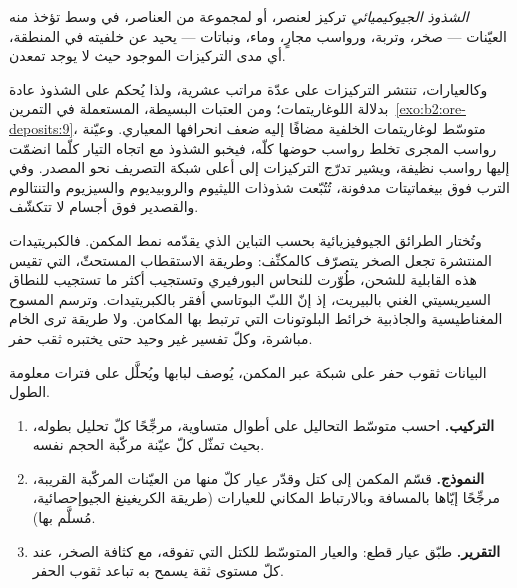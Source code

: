 \begin{definition}\label{def:b2:ore-deposits:exploration}
\emph{الشذوذ الجيوكيميائي} تركيز لعنصر، أو لمجموعة من
العناصر، في وسط تؤخذ منه العيّنات --- صخر، وتربة، ورواسب مجارٍ، وماء، ونباتات --- يحيد
عن خلفيته في المنطقة، أي مدى التركيزات الموجود حيث لا يوجد
تمعدن.
\end{definition}

وكالعيارات، تنتشر التركيزات على عدّة مراتب عشرية، ولذا يُحكم على الشذوذ عادة بدلالة
اللوغاريتمات؛ ومن العتبات البسيطة، المستعملة في التمرين~\ref{exo:b2:ore-deposits:9}، متوسّط
لوغاريتمات الخلفية مضافًا إليه ضعف انحرافها المعياري. وعيّنة رواسب المجرى
تخلط رواسب حوضها كلّه، فيخبو الشذوذ مع اتجاه التيار كلّما انضمّت إليها رواسب نظيفة،
ويشير تدرّج التركيزات إلى أعلى شبكة التصريف نحو المصدر. وفي الترب فوق
بيغماتيتات مدفونة، تُتُبّعت شذوذات الليثيوم والروبيديوم والسيزيوم والتنتالوم والقصدير فوق
أجسام لا تتكشّف.

وتُختار الطرائق الجيوفيزيائية بحسب التباين الذي يقدّمه نمط المكمن. فالكبريتيدات المنتشرة تجعل
الصخر يتصرّف كالمكثّف: وطريقة الاستقطاب المستحثّ، التي تقيس هذه القابلية للشحن، طُوّرت
للنحاس البورفيري وتستجيب أكثر ما تستجيب للنطاق السيريسيتي الغني بالبيريت، إذ إنّ اللبّ البوتاسي
أفقر بالكبريتيدات. وترسم المسوح المغناطيسية والجاذبية خرائط البلوتونات التي ترتبط بها المكامن.
ولا طريقة ترى الخام
مباشرة، وكلّ تفسير غير وحيد حتى يختبره ثقب حفر.

\begin{method}\label{met:b2:ore-deposits:resource}
البيانات ثقوب حفر على شبكة عبر المكمن، يُوصف لبابها ويُحلَّل على فترات
معلومة الطول.
\begin{enumerate}
  \item \textbf{التركيب.} احسب متوسّط التحاليل على أطوال متساوية، مرجِّحًا كلّ تحليل
        بطوله، بحيث تمثّل كلّ عيّنة مركّبة الحجم نفسه.
  \item \textbf{النموذج.} قسّم المكمن إلى كتل وقدّر عيار كلّ منها من
        العيّنات المركّبة القريبة، مرجِّحًا إيّاها بالمسافة وبالارتباط المكاني للعيارات
        (طريقة الكريغينغ الجيوإحصائية، مُسلَّم بها).
  \item \textbf{التقرير.} طبّق عيار قطع:  والعيار المتوسّط للكتل التي تفوقه، مع
        كثافة الصخر، عند كلّ مستوى ثقة يسمح به تباعد ثقوب الحفر.
\end{enumerate}
\end{method}

